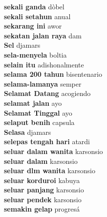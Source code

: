 \textbf{ sekali ganda  } dòbel \\
\textbf{ sekali setahun  } anual \\
\textbf{ sekarang ini  } awor \\
\textbf{ sekatan jalan raya  } dam \\
\textbf{ Sel  } djamars \\
\textbf{ sela-menyela  } boltia \\
\textbf{ selain itu  } adishonalmente \\
\textbf{ selama 200 tahun  } bisentenario \\
\textbf{ selama-lamanya  } semper \\
\textbf{ Selamat Datang  } acogiendo \\
\textbf{ selamat jalan  } ayo \\
\textbf{ Selamat Tinggal  } ayo \\
\textbf{ selaput benih  } capsula \\
\textbf{ Selasa  } djamars \\
\textbf{ selepas tengah hari  } atardi \\
\textbf{ seluar dalam wanita  } karsonsio \\
\textbf{ seluar dalam  } karsonsio \\
\textbf{ seluar dlm wanita  } karsonsio \\
\textbf{ seluar korduroi  } kabuya \\
\textbf{ seluar panjang  } karsonsio \\
\textbf{ seluar pendek  } karsonsio \\
\textbf{ semakin gelap  } progresá \\
